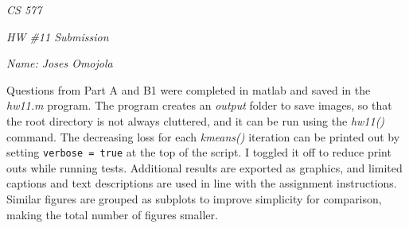 \documentclass[12pt]{report}
\begin{document}
\centerline{\it CS 577}
\centerline{\it HW \#11 Submission}
\centerline{\it Name: Joses Omojola}

Questions from Part A and B1 were completed in matlab and saved in the \emph{hw11.m} program. The program creates an \emph{output} folder to save images, so that the 
root directory is not always cluttered, and it can be run using the \textit{hw11()} command. The decreasing loss for each \emph{kmeans()} iteration can be printed out 
by setting \verb|verbose = true| at the top of the script. I toggled it off to reduce print outs while running tests. Additional results are exported as graphics, and 
limited captions and text descriptions are used in line with the assignment instructions. Similar figures are grouped as subplots to improve simplicity for comparison, 
making the total number of figures smaller.
\end{document}
